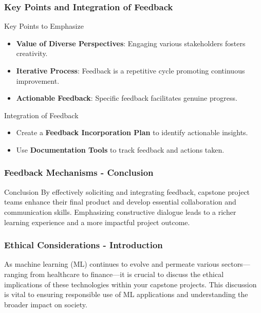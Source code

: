 \documentclass{beamer}
\begin{document}
\begin{frame}[fragile]
    \frametitle{Key Points and Integration of Feedback}
    \begin{block}{Key Points to Emphasize}
        \begin{itemize}
            \item \textbf{Value of Diverse Perspectives}: Engaging various stakeholders fosters creativity.
            \item \textbf{Iterative Process}: Feedback is a repetitive cycle promoting continuous improvement.
            \item \textbf{Actionable Feedback}: Specific feedback facilitates genuine progress.
        \end{itemize}
    \end{block}
    
    \begin{block}{Integration of Feedback}
        \begin{itemize}
            \item Create a \textbf{Feedback Incorporation Plan} to identify actionable insights.
            \item Use \textbf{Documentation Tools} to track feedback and actions taken.
        \end{itemize}
    \end{block}
\end{frame}

\begin{frame}[fragile]
    \frametitle{Feedback Mechanisms - Conclusion}
    \begin{block}{Conclusion}
        By effectively soliciting and integrating feedback, capstone project teams enhance their final product and develop essential collaboration and communication skills. Emphasizing constructive dialogue leads to a richer learning experience and a more impactful project outcome.
    \end{block}
\end{frame}

\begin{frame}[fragile]
    \frametitle{Ethical Considerations - Introduction}
    As machine learning (ML) continues to evolve and permeate various sectors—ranging from healthcare to finance—it is crucial to discuss the ethical implications of these technologies within your capstone projects. This discussion is vital to ensuring responsible use of ML applications and understanding the broader impact on society.
\end{frame}
\end{document}
